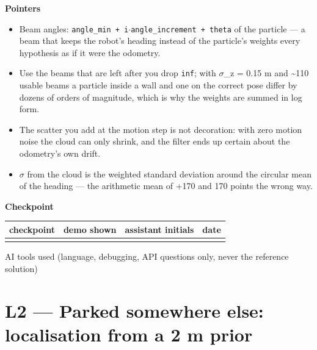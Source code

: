 \documentclass[a4paper,10pt]{article}
\begin{document}
\vspace{4pt}\noindent\textbf{Pointers}

\begin{itemize}\itemsep1pt

\item Beam angles: \texttt{angle\_min\ +\ i\(\cdot\)angle\_increment\ +\ theta} of the particle --- a beam that keeps the robot's heading instead of the particle's weights every hypothesis as if it were the odometry.

\item Use the beams that are left after you drop \texttt{inf}; with \(\sigma\)\_z = 0.15 m and \textasciitilde{}110 usable beams a particle inside a wall and one on the correct pose differ by dozens of orders of magnitude, which is why the weights are summed in log form.

\item The scatter you add at the motion step is not decoration: with zero motion noise the cloud can only shrink, and the filter ends up certain about the odometry's own drift.

\item \(\sigma\) from the cloud is the weighted standard deviation around the circular mean of the heading --- the arithmetic mean of +170\textdegree{} and \textminus{}170\textdegree{} points the wrong way.

\end{itemize}

\vspace{4pt}\noindent\textbf{Checkpoint}

\begin{tabular}{|>{\raggedright\hyphenpenalty 500\arraybackslash}p{4.87cm}|>{\raggedright\hyphenpenalty 500\arraybackslash}p{2.80cm}|>{\raggedright\hyphenpenalty 500\arraybackslash}p{4.48cm}|>{\raggedright\hyphenpenalty 500\arraybackslash}p{2.34cm}|}
\hline
\textbf{checkpoint} & \textbf{demo shown} & \textbf{assistant initials} & \textbf{date} \\
\hline
\rule{0pt}{2.4em} & \rule{0pt}{2.4em} & \rule{0pt}{2.4em} & \rule{0pt}{2.4em} \\
\hline
\end{tabular}

\vspace{2pt}\noindent AI tools used (language, debugging, API questions only, never the reference solution)\hrulefill

\newpage

\section{L2 --- Parked somewhere else: localisation from a 2 m prior}
\end{document}
